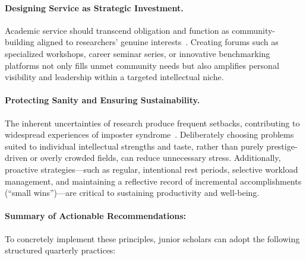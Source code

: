 \paragraph{Designing Service as Strategic Investment.}
Academic service should transcend obligation and function as community-building aligned to researchers' genuine interests~\citep{bhattad2025jrgrads}.
Creating forums such as specialized workshops, career seminar series, or innovative benchmarking platforms not only fills unmet community needs but also amplifies personal visibility and leadership within a targeted intellectual niche.

\paragraph{Protecting Sanity and Ensuring Sustainability.}
The inherent uncertainties of research produce frequent setbacks, contributing to widespread experiences of imposter syndrome~\citep{bhattad2025jrgrads}.
Deliberately choosing problems suited to individual intellectual strengths and taste, rather than purely prestige-driven or overly crowded fields, can reduce unnecessary stress.
Additionally, proactive strategies---such as regular, intentional rest periods, selective workload management, and maintaining a reflective record of incremental accomplishments (``small wins'')---are critical to sustaining productivity and well-being.

\paragraph{Summary of Actionable Recommendations:}
To concretely implement these principles, junior scholars can adopt the following structured quarterly practices:

